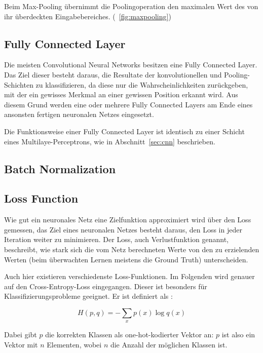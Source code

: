 Beim Max-Pooling übernimmt die Poolingoperation den maximalen Wert des von ihr überdeckten Eingabebereiches. (\vgl \figurename~\ref{fig:maxpooling})

\subsection{Fully Connected Layer}
\label{ssec:fcn}
Die meisten Convolutional Neural Networks besitzen eine Fully Connected Layer. Das Ziel dieser besteht daraus, die Resultate der konvolutionellen und Pooling-Schichten zu klassifizieren, da diese nur die Wahrscheinlichkeiten zurückgeben, mit der ein gewisses Merkmal an einer gewissen Position erkannt wird. Aus diesem Grund werden eine oder mehrere Fully Connected Layers am Ende eines ansonsten fertigen neuronalen Netzes eingesetzt. \cite{geva}

Die Funktionsweise einer Fully Connected Layer ist identisch zu einer Schicht eines Multilaye-Perceptrons, wie in Abschnitt~\ref{sec:cnn} beschrieben.

\subsection{Batch Normalization}
\label{ssec:bn}

\subsection{Loss Function}
\label{ssec:loss}

Wie gut ein neuronales Netz eine Zielfunktion approximiert wird über den Loss gemessen, \dahe das Ziel eines neuronalen Netzes besteht daraus, den Loss in jeder Iteration weiter zu minimieren. Der Loss, auch Verlustfunktion genannt, beschreibt, wie stark sich die vom Netz berechneten Werte von den zu erzielenden Werten (beim überwachten Lernen meistens die Ground Truth) unterscheiden.

Auch hier existieren verschiedenste Loss-Funktionen. Im Folgenden wird genauer auf den Cross-Entropy-Loss eingegangen. Dieser ist besonders für Klassifizierungsprobleme geeignet. Er ist definiert als \cite{cs231n}:

\begin{equation}
H(p,q) = -\sum_x p(x)\log q(x)
\end{equation}

Dabei gibt $p$ die korrekten Klassen als one-hot-kodierter Vektor an: $p$ ist also ein Vektor mit $n$ Elementen, wobei $n$ die Anzahl der möglichen Klassen ist. 


